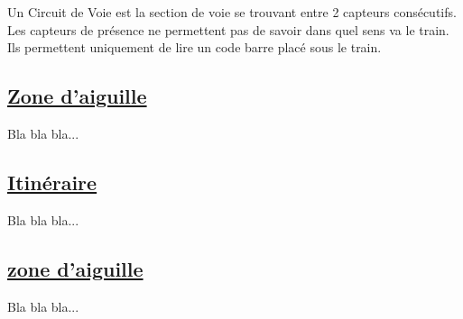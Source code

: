 Un Circuit de Voie est la section de voie se trouvant entre 2 capteurs
consécutifs. Les capteurs de présence ne permettent pas de savoir dans
quel sens va le train. Ils permettent uniquement de lire un code barre
placé sous le train.  

\subsection{\underline{Zone d'aiguille}}
\label{sec:aig}

Bla bla bla...


\subsection{\underline{Itinéraire}}
\label{sec:iti}

Bla bla bla...

\subsection{\underline{zone d'aiguille}}
\label{sec:aig}

Bla bla bla...



\newpage





